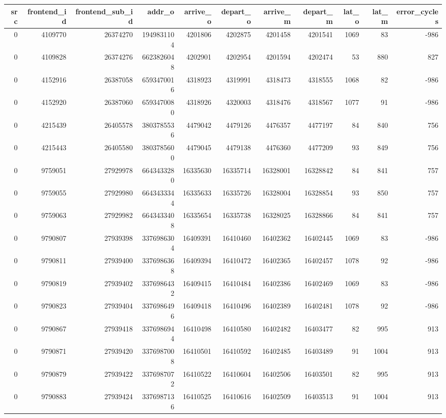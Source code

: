 \begin{tabular}{rrrrrrrrrrr}
\toprule
src & frontend\_id & frontend\_sub\_id & addr\_o & arrive\_o & depart\_o & arrive\_m & depart\_m & lat\_o & lat\_m & error\_cycles \\
\midrule
0 & 4109770 & 26374270 & 1949831104 & 4201806 & 4202875 & 4201458 & 4201541 & 1069 & 83 & -986 \\
0 & 4109828 & 26374276 & 6623826048 & 4202901 & 4202954 & 4201594 & 4202474 & 53 & 880 & 827 \\
0 & 4152916 & 26387058 & 6593470016 & 4318923 & 4319991 & 4318473 & 4318555 & 1068 & 82 & -986 \\
0 & 4152920 & 26387060 & 6593470080 & 4318926 & 4320003 & 4318476 & 4318567 & 1077 & 91 & -986 \\
0 & 4215439 & 26405578 & 3803785536 & 4479042 & 4479126 & 4476357 & 4477197 & 84 & 840 & 756 \\
0 & 4215443 & 26405580 & 3803785600 & 4479045 & 4479138 & 4476360 & 4477209 & 93 & 849 & 756 \\
0 & 9759051 & 27929978 & 6643433280 & 16335630 & 16335714 & 16328001 & 16328842 & 84 & 841 & 757 \\
0 & 9759055 & 27929980 & 6643433344 & 16335633 & 16335726 & 16328004 & 16328854 & 93 & 850 & 757 \\
0 & 9759063 & 27929982 & 6643433408 & 16335654 & 16335738 & 16328025 & 16328866 & 84 & 841 & 757 \\
0 & 9790807 & 27939398 & 3376986304 & 16409391 & 16410460 & 16402362 & 16402445 & 1069 & 83 & -986 \\
0 & 9790811 & 27939400 & 3376986368 & 16409394 & 16410472 & 16402365 & 16402457 & 1078 & 92 & -986 \\
0 & 9790819 & 27939402 & 3376986432 & 16409415 & 16410484 & 16402386 & 16402469 & 1069 & 83 & -986 \\
0 & 9790823 & 27939404 & 3376986496 & 16409418 & 16410496 & 16402389 & 16402481 & 1078 & 92 & -986 \\
0 & 9790867 & 27939418 & 3376986944 & 16410498 & 16410580 & 16402482 & 16403477 & 82 & 995 & 913 \\
0 & 9790871 & 27939420 & 3376987008 & 16410501 & 16410592 & 16402485 & 16403489 & 91 & 1004 & 913 \\
0 & 9790879 & 27939422 & 3376987072 & 16410522 & 16410604 & 16402506 & 16403501 & 82 & 995 & 913 \\
0 & 9790883 & 27939424 & 3376987136 & 16410525 & 16410616 & 16402509 & 16403513 & 91 & 1004 & 913 \\

\end{tabular}
